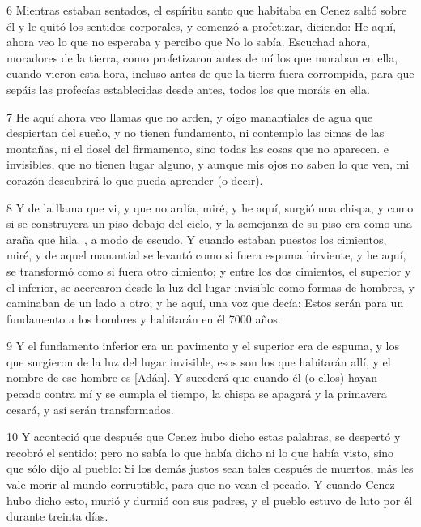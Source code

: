 \par 6 Mientras estaban sentados, el espíritu santo que habitaba en Cenez saltó sobre él y le quitó los sentidos corporales, y comenzó a profetizar, diciendo: He aquí, ahora veo lo que no esperaba y percibo que No lo sabía. Escuchad ahora, moradores de la tierra, como profetizaron antes de mí los que moraban en ella, cuando vieron esta hora, incluso antes de que la tierra fuera corrompida, para que sepáis las profecías establecidas desde antes, todos los que moráis en ella.

\par 7 He aquí ahora veo llamas que no arden, y oigo manantiales de agua que despiertan del sueño, y no tienen fundamento, ni contemplo las cimas de las montañas, ni el dosel del firmamento, sino todas las cosas que no aparecen. e invisibles, que no tienen lugar alguno, y aunque mis ojos no saben lo que ven, mi corazón descubrirá lo que pueda aprender (o decir).

\par 8 Y de la llama que vi, y que no ardía, miré, y he aquí, surgió una chispa, y como si se construyera un piso debajo del cielo, y la semejanza de su piso era como una araña que hila. , a modo de escudo. Y cuando estaban puestos los cimientos, miré, y de aquel manantial se levantó como si fuera espuma hirviente, y he aquí, se transformó como si fuera otro cimiento; y entre los dos cimientos, el superior y el inferior, se acercaron desde la luz del lugar invisible como formas de hombres, y caminaban de un lado a otro; y he aquí, una voz que decía: Estos serán para un fundamento a los hombres y habitarán en él 7000 años.

\par 9 Y el fundamento inferior era un pavimento y el superior era de espuma, y ​​los que surgieron de la luz del lugar invisible, esos son los que habitarán allí, y el nombre de ese hombre es [Adán]. Y sucederá que cuando él (o ellos) hayan pecado contra mí y se cumpla el tiempo, la chispa se apagará y la primavera cesará, y así serán transformados.

\par 10 Y aconteció que después que Cenez hubo dicho estas palabras, se despertó y recobró el sentido; pero no sabía lo que había dicho ni lo que había visto, sino que sólo dijo al pueblo: Si los demás justos sean tales después de muertos, más les vale morir al mundo corruptible, para que no vean el pecado. Y cuando Cenez hubo dicho esto, murió y durmió con sus padres, y el pueblo estuvo de luto por él durante treinta días.



